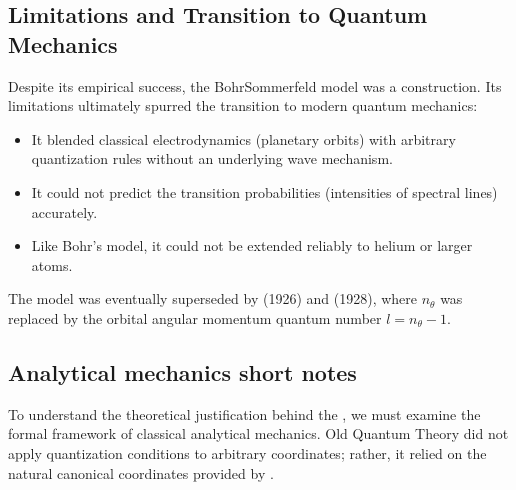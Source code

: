 \documentclass[letterpaper,10pt,english]{jupyterBook}
\begin{document}
\subsection{Limitations and Transition to Quantum Mechanics}
\label{\detokenize{ch/quantum-mechanics/atom-models/sommerfeld:limitations-and-transition-to-quantum-mechanics}}
\sphinxAtStartPar
Despite its empirical success, the Bohr\sphinxhyphen{}Sommerfeld model was a  construction. Its limitations ultimately spurred the transition to modern quantum mechanics:
\begin{itemize}
\item {} 
\sphinxAtStartPar
{} It blended classical electrodynamics (planetary orbits) with arbitrary quantization rules without an underlying wave mechanism.

\item {} 
\sphinxAtStartPar
{} It could not predict the transition probabilities (intensities of spectral lines) accurately.

\item {} 
\sphinxAtStartPar
{} Like Bohr’s model, it could not be extended reliably to helium or larger atoms.

\end{itemize}

\sphinxAtStartPar
The model was eventually superseded by {\hyperref[\detokenize{ch/quantum-mechanics/atom-models/schrodinger:quantum-mechanics-atom-models-schrodinger}]{}} (1926) and  (1928), where \(n_\theta\) was replaced by the orbital angular momentum quantum number \(l = n_\theta - 1\).

\sphinxstepscope


\subsection{Analytical mechanics \sphinxhyphen{} short notes}
\label{\detokenize{ch/quantum-mechanics/atom-models/analytical-mechanics-short:analytical-mechanics-short-notes}}\label{\detokenize{ch/quantum-mechanics/atom-models/analytical-mechanics-short:analytical-mechanics-short}}\label{\detokenize{ch/quantum-mechanics/atom-models/analytical-mechanics-short::doc}}
\sphinxAtStartPar
To understand the theoretical justification behind the , we must examine the formal framework of classical analytical mechanics. Old Quantum Theory did not apply quantization conditions to arbitrary coordinates; rather, it relied on the natural canonical coordinates provided by .
\end{document}
